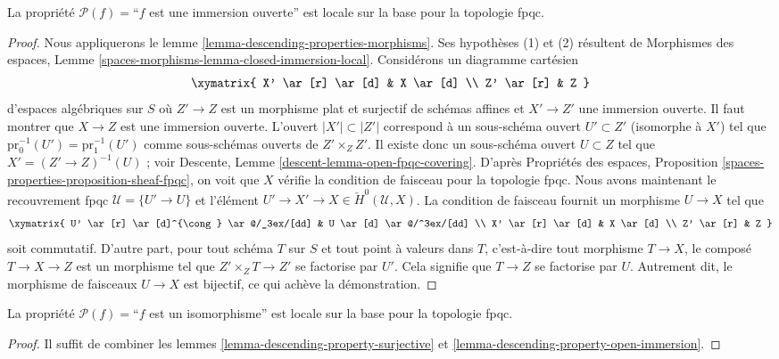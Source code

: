 \begin{lemma}
\label{lemma-descending-property-open-immersion}
La propriété $\mathcal{P}(f) =$``$f$ est une immersion ouverte''
est locale sur la base pour la topologie fpqc.
\end{lemma}

\begin{proof}
Nous appliquerons le
lemme \ref{lemma-descending-properties-morphisms}.
Ses hypothèses (1) et (2) résultent de
Morphismes des espaces,
Lemme \ref{spaces-morphisms-lemma-closed-immersion-local}.
Considérons un diagramme cartésien
$$
\xymatrix{
X' \ar[r] \ar[d] & X \ar[d] \\
Z' \ar[r] & Z
}
$$
d'espaces algébriques sur $S$
où $Z' \to Z$ est un morphisme plat et surjectif de schémas affines
et $X' \to Z'$ une immersion ouverte. Il faut montrer que $X \to Z$
est une immersion ouverte. L'ouvert $|X'| \subset |Z'|$ correspond à un
sous-schéma ouvert $U' \subset Z'$ (isomorphe à $X'$)
tel que $\text{pr}_0^{-1}(U') = \text{pr}_1^{-1}(U')$
comme sous-schémas ouverts de $Z' \times_Z Z'$. Il existe donc un
sous-schéma ouvert $U \subset Z$ tel que $X' = (Z' \to Z)^{-1}(U)$ ; voir
Descente, Lemme \ref{descent-lemma-open-fpqc-covering}.
D'après Propriétés des espaces,
Proposition \ref{spaces-properties-proposition-sheaf-fpqc},
on voit que $X$ vérifie la condition de faisceau pour la topologie fpqc.
Nous avons maintenant le recouvrement fpqc $\mathcal{U} = \{U' \to U\}$
et l'élément $U' \to X' \to X \in \check{H}^0(\mathcal{U}, X)$.
La condition de faisceau fournit un morphisme $U \to X$ tel que
$$
\xymatrix{
U' \ar[r] \ar[d]^{\cong} \ar@/_3ex/[dd] & U \ar[d] \ar@/^3ex/[dd] \\
X' \ar[r] \ar[d] & X \ar[d] \\
Z' \ar[r] & Z
}
$$
soit commutatif. D'autre part, pour tout schéma $T$ sur $S$
et tout point à valeurs dans $T$, c'est-à-dire tout morphisme $T \to X$, le composé $T \to X \to Z$ est un
morphisme tel que $Z' \times_Z T \to Z'$ se factorise par $U'$. Cela
signifie que $T \to Z$ se factorise par $U$. Autrement dit, le morphisme
de faisceaux $U \to X$ est bijectif, ce qui achève la démonstration.
\end{proof}

\begin{lemma}
\label{lemma-descending-property-isomorphism}
La propriété $\mathcal{P}(f) =$``$f$ est un isomorphisme''
est locale sur la base pour la topologie fpqc.
\end{lemma}

\begin{proof}
Il suffit de combiner les lemmes \ref{lemma-descending-property-surjective}
et \ref{lemma-descending-property-open-immersion}.
\end{proof}


